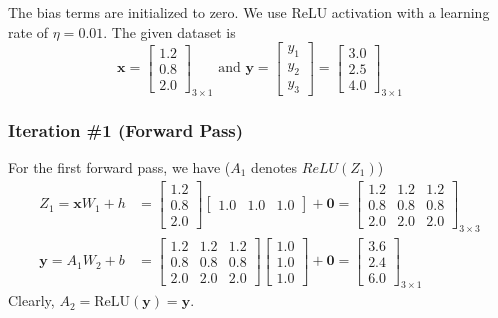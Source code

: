 \documentclass[12pt]{article}
\begin{document}
    The bias terms are initialized to zero. We use ReLU activation with a learning rate of $\eta = 0.01$.
    The given dataset is
    \begin{equation*}
        \mathbf{x} = \begin{bmatrix}
            1.2 \\ 0.8 \\ 2.0
        \end{bmatrix}_{3 \times 1} \text{ and } \mathbf{y} = \begin{bmatrix}
            y_{1} \\ y_{2} \\ y_{3}
        \end{bmatrix} = \begin{bmatrix}
            3.0 \\ 2.5 \\ 4.0
        \end{bmatrix}_{3 \times 1}
    \end{equation*}

    \subsubsection*{Iteration \#1 (Forward Pass)}
    For the first forward pass, we have ($A_{1}$ denotes $ReLU(Z_{1})$)
    \begin{align}
        Z_{1} = \mathbf{x} W_{1} + h &= \begin{bmatrix}
            1.2 \\ 0.8 \\ 2.0
        \end{bmatrix} \begin{bmatrix}
            1.0 & 1.0 & 1.0
        \end{bmatrix} + \mathbf{0} = \begin{bmatrix}
            1.2 & 1.2 & 1.2 \\
            0.8 & 0.8 & 0.8 \\
            2.0 & 2.0 & 2.0
        \end{bmatrix}_{3 \times 3}\\
        \mathbf{y} = A_{1} W_{2} + b &= \begin{bmatrix}
            1.2 & 1.2 & 1.2 \\
            0.8 & 0.8 & 0.8 \\
            2.0 & 2.0 & 2.0
        \end{bmatrix} \begin{bmatrix}
            1.0 \\ 1.0 \\ 1.0
        \end{bmatrix} + \mathbf{0} = \begin{bmatrix}
            3.6 \\ 2.4 \\ 6.0
        \end{bmatrix}_{3 \times 1}
    \end{align}
    Clearly, $A_{2} = \text{ReLU}(\mathbf{y}) = \mathbf{y}$.
\end{document}
